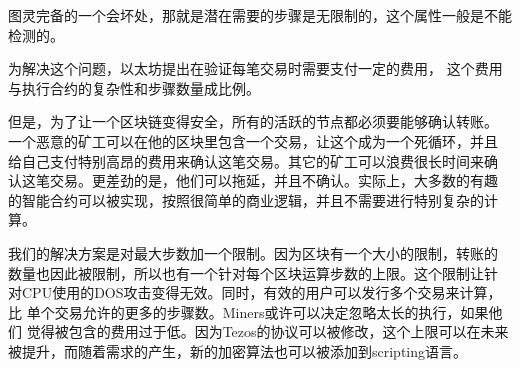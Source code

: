 \documentclass[letterpaper]{article}
\begin{document}
图灵完备的一个会坏处，那就是潜在需要的步骤是无限制的，这个属性一般是不能检测的。

为解决这个问题，以太坊提出在验证每笔交易时需要支付一定的费用，
这个费用与执行合约的复杂性和步骤数量成比例。

但是，为了让一个区块链变得安全，所有的活跃的节点都必须要能够确认转账。
一个恶意的矿工可以在他的区块里包含一个交易，让这个成为一个死循环，并且
给自己支付特别高昂的费用来确认这笔交易。其它的矿工可以浪费很长时间来确
认这笔交易。更差劲的是，他们可以拖延，并且不确认。实际上，大多数的有趣
的智能合约可以被实现，按照很简单的商业逻辑，并且不需要进行特别复杂的计
算。

我们的解决方案是对最大步数加一个限制。因为区块有一个大小的限制，转账的
数量也因此被限制，所以也有一个针对每个区块运算步数的上限。这个限制让针
对CPU使用的DOS攻击变得无效。同时，有效的用户可以发行多个交易来计算，比
单个交易允许的更多的步骤数。Miners或许可以决定忽略太长的执行，如果他们
觉得被包含的费用过于低。因为Tezos的协议可以被修改，这个上限可以在未来
被提升，而随着需求的产生，新的加密算法也可以被添加到scripting语言。
\end{document}
